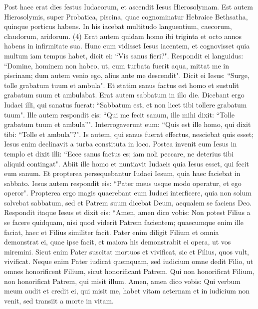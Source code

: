 \begin{biblechapter}  
\verse Post haec erat dies festus Iudaeorum, et ascendit Iesus Hierosolymam. 
\verse Est autem Hierosolymis, super Probatica, piscina, quae cognominatur Hebraice Bethsatha, quinque porticus habens. 
\verse In his iacebat multitudo languentium, caecorum, claudorum, aridorum. (4) 
\verse Erat autem quidam homo ibi triginta et octo annos habens in infirmitate sua. 
\verse Hunc cum vidisset Iesus iacentem, et cognovisset quia multum iam tempus habet, dicit ei: “Vis sanus fieri?". 
\verse Respondit ei languidus: “Domine, hominem non habeo, ut, cum turbata fuerit aqua, mittat me in piscinam; dum autem venio ego, alius ante me descendit".  
\verse Dicit ei Iesus: “Surge, tolle grabatum tuum et ambula". 
\verse Et statim sanus factus est homo et sustulit grabatum suum et ambulabat. Erat autem sabbatum in illo die. 
\verse Dicebant ergo Iudaei illi, qui sanatus fuerat: “Sabbatum est, et non licet tibi tollere grabatum tuum". 
\verse Ille autem respondit eis: “Qui me fecit sanum, ille mihi dixit: “Tolle grabatum tuum et ambula”". 
\verse Interrogaverunt eum: “Quis est ille homo, qui dixit tibi: “Tolle et ambula”?". 
\verse Is autem, qui sanus fuerat effectus, nesciebat quis esset; Iesus enim declinavit a turba constituta in loco. 
\verse Postea invenit eum Iesus in templo et dixit illi: “Ecce sanus factus es; iam noli peccare, ne deterius tibi aliquid contingat". 
\verse Abiit ille homo et nuntiavit Iudaeis quia Iesus esset, qui fecit eum sanum. 
\verse Et propterea persequebantur Iudaei Iesum, quia haec faciebat in sabbato. 
\verse Iesus autem respondit eis: “Pater meus usque modo operatur, et ego operor". 
\verse Propterea ergo magis quaerebant eum Iudaei interficere, quia non solum solvebat sabbatum, sed et Patrem suum dicebat Deum, aequalem se faciens Deo. 
\verse Respondit itaque Iesus et dixit eis: “Amen, amen dico vobis: Non potest Filius a se facere quidquam, nisi quod viderit Patrem facientem; quaecumque enim ille faciat, haec et Filius similiter facit. 
\verse Pater enim diligit Filium et omnia demonstrat ei, quae ipse facit, et maiora his demonstrabit ei opera, ut vos miremini. 
\verse Sicut enim Pater suscitat mortuos et vivificat, sic et Filius, quos vult, vivificat. 
\verse Neque enim Pater iudicat quemquam, sed iudicium omne dedit Filio, 
\verse ut omnes honorificent Filium, sicut honorificant Patrem. Qui non honorificat Filium, non honorificat Patrem, qui misit illum. 
\verse Amen, amen dico vobis: Qui verbum meum audit et credit ei, qui misit me, habet vitam aeternam et in iudicium non venit, sed transiit a morte in vitam. 

\end{biblechapter}
